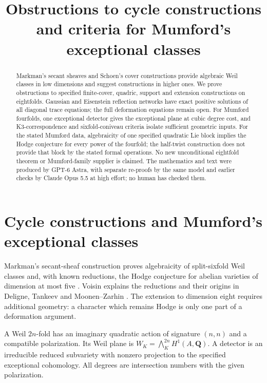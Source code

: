 \documentclass[11pt]{article}
\title{Obstructions to cycle constructions and criteria for Mumford's exceptional classes}
\author{}
\date{}
\theoremstyle{definition}
\theoremstyle{remark}
\newcommand{\Q}{\mathbf Q}
\begin{document}
\maketitle
\begin{abstract}
Markman's secant sheaves and Schoen's cover constructions provide
algebraic Weil classes in low dimensions and suggest constructions in
higher ones. We prove obstructions to specified finite-cover, quadric,
support and extension constructions on eightfolds. Gaussian and Eisenstein reflection
networks have exact positive solutions of all diagonal trace equations;
the full deformation equations remain open. For Mumford fourfolds,
one exceptional detector gives the exceptional plane at cubic degree
cost, and K3-correspondence and sixfold-coniveau criteria isolate
sufficient geometric inputs. For the stated Mumford data, algebraicity
of one specified quadratic Lie block implies the Hodge conjecture for
every power of the fourfold; the half-twist construction does not
provide that block by the stated formal operations.
No new unconditional eightfold theorem
or Mumford-family supplier is claimed. The mathematics and text were
produced by GPT-6 Astra, with separate re-proofs by the same model and
earlier checks by Claude Opus 5.5 at high effort; no human has checked them.
\end{abstract}

\section{Cycle constructions and Mumford's exceptional classes}
\label{sec:introduction-b}
Markman's secant-sheaf construction proves algebraicity of split-sixfold
Weil classes and, with known reductions, the Hodge conjecture for
abelian varieties of dimension at most five
\cite[Theorem~1.2 and Corollary~1.3, pp.~587--588]{MarkmanICM}.
Voisin explains the reductions and their origins in Deligne, Tankeev
and Moonen--Zarhin \cite[Th\'eor\`emes~1.3--1.4,
p.~1248--03; \S2.3]{VoisinB}. The extension to dimension eight
requires additional geometry: a character which remains Hodge is
only one part of a deformation argument.

A Weil $2n$-fold has an imaginary quadratic action of signature $(n,n)$
and a compatible polarization. Its Weil plane is
$W_K=\bigwedge_K^{2n}H^1(A,\Q)$. A detector is an irreducible reduced
subvariety with nonzero projection to the specified exceptional
cohomology. All degrees are intersection numbers with the given
polarization.
\end{document}
